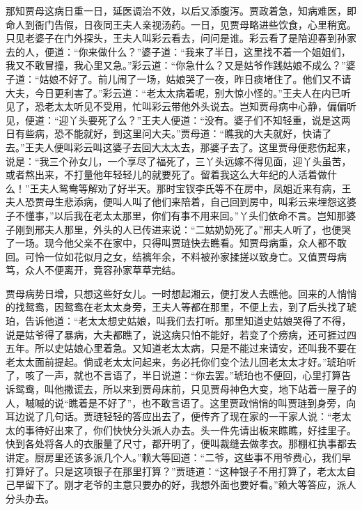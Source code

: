 \begin{parag}
    那知贾母这病日重一日，延医调治不效，以后又添腹泻。贾政着急，知病难医，即命人到衙门告假，日夜同王夫人亲视汤药。一日，见贾母略进些饮食，心里稍宽。只见老婆子在门外探头，王夫人叫彩云看去，问问是谁。彩云看了是陪迎春到孙家去的人，便道：“你来做什么？”婆子道：“我来了半日，这里找不着一个姐姐们，我又不敢冒撞，我心里又急。”彩云道：“你急什么？又是姑爷作践姑娘不成么？”婆子道：“姑娘不好了。前儿闹了一场，姑娘哭了一夜，昨日痰堵住了。他们又不请大夫，今日更利害了。”彩云道：“老太太病着呢，别大惊小怪的。”王夫人在内已听见了，恐老太太听见不受用，忙叫彩云带他外头说去。岂知贾母病中心静，偏偏听见，便道：“迎丫头要死了么？”王夫人便道：“没有。婆子们不知轻重，说是这两日有些病，恐不能就好，到这里问大夫。”贾母道：“瞧我的大夫就好，快请了去。”王夫人便叫彩云叫这婆子去回大太太去，那婆子去了。这里贾母便悲伤起来，说是：“我三个孙女儿，一个享尽了福死了，三丫头远嫁不得见面，迎丫头虽苦，或者熬出来，不打量他年轻轻儿的就要死了。留着我这么大年纪的人活着做什么！”王夫人鸳鸯等解劝了好半天。那时宝钗李氏等不在房中，凤姐近来有病，王夫人恐贾母生悲添病，便叫人叫了他们来陪着，自己回到房中，叫彩云来埋怨这婆子不懂事，”以后我在老太太那里，你们有事不用来回。”丫头们依命不言。岂知那婆子刚到邢夫人那里，外头的人已传进来说：“二姑奶奶死了。”邢夫人听了，也便哭了一场。现今他父亲不在家中，只得叫贾琏快去瞧看。知贾母病重，众人都不敢回。可怜一位如花似月之女，结褵年余，不料被孙家揉搓以致身亡。又值贾母病笃，众人不便离开，竟容孙家草草完结。
\end{parag}


\begin{parag}
    贾母病势日增，只想这些好女儿。一时想起湘云，便打发人去瞧他。回来的人悄悄的找鸳鸯，因鸳鸯在老太太身旁，王夫人等都在那里，不便上去，到了后头找了琥珀，告诉他道：“老太太想史姑娘，叫我们去打听。那里知道史姑娘哭得了不得，说是姑爷得了暴病，大夫都瞧了，说这病只怕不能好，若变了个痨病，还可捱过四五年。所以史姑娘心里着急。又知道老太太病，只是不能过来请安，还叫我不要在老太太面前提起。倘或老太太问起来，务必托你们变个法儿回老太太才好。”琥珀听了，咳了一声，就也不言语了，半日说道：“你去罢。”琥珀也不便回，心里打算告诉鸳鸯，叫他撒谎去，所以来到贾母床前，只见贾母神色大变，地下站着一屋子的人，嘁嘁的说“瞧着是不好了”，也不敢言语了。这里贾政悄悄的叫贾琏到身旁，向耳边说了几句话。贾琏轻轻的答应出去了，便传齐了现在家的一干家人说：“老太太的事待好出来了，你们快快分头派人办去。头一件先请出板来瞧瞧，好挂里子。快到各处将各人的衣服量了尺寸，都开明了，便叫裁缝去做孝衣。那棚杠执事都去讲定。厨房里还该多派几个人。”赖大等回道：“二爷，这些事不用爷费心，我们早打算好了。只是这项银子在那里打算？”贾琏道：“这种银子不用打算了，老太太自己早留下了。刚才老爷的主意只要办的好，我想外面也要好看。”赖大等答应，派人分头办去。
\end{parag}


